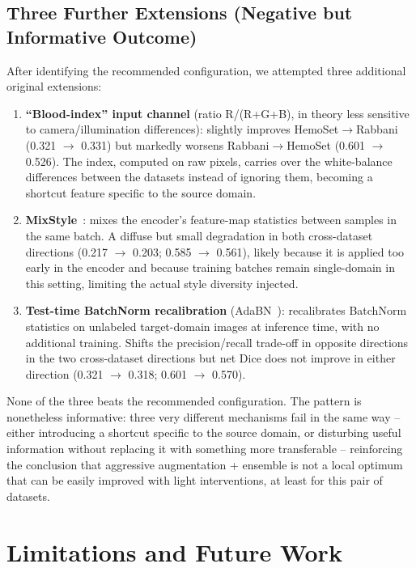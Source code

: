 \documentclass[10pt,conference]{IEEEtran}
\begin{document}
\subsection{Three Further Extensions (Negative but Informative Outcome)}
\label{sec:extensions}

After identifying the recommended configuration, we attempted three additional original extensions:

\begin{enumerate}
\item \textbf{``Blood-index'' input channel} (ratio R/(R+G+B), in theory less sensitive to camera/illumination differences): slightly improves HemoSet$\rightarrow$Rabbani (0.321 $\rightarrow$ 0.331) but markedly worsens Rabbani$\rightarrow$HemoSet (0.601 $\rightarrow$ 0.526). The index, computed on raw pixels, carries over the white-balance differences between the datasets instead of ignoring them, becoming a shortcut feature specific to the source domain.
\item \textbf{MixStyle}~\cite{zhou2021mixstyle}: mixes the encoder's feature-map statistics between samples in the same batch. A diffuse but small degradation in both cross-dataset directions (0.217 $\rightarrow$ 0.203; 0.585 $\rightarrow$ 0.561), likely because it is applied too early in the encoder and because training batches remain single-domain in this setting, limiting the actual style diversity injected.
\item \textbf{Test-time BatchNorm recalibration} (AdaBN~\cite{li2016adabn}): recalibrates BatchNorm statistics on unlabeled target-domain images at inference time, with no additional training. Shifts the precision/recall trade-off in opposite directions in the two cross-dataset directions but net Dice does not improve in either direction (0.321 $\rightarrow$ 0.318; 0.601 $\rightarrow$ 0.570).
\end{enumerate}

None of the three beats the recommended configuration. The pattern is nonetheless informative: three very different mechanisms fail in the same way -- either introducing a shortcut specific to the source domain, or disturbing useful information without replacing it with something more transferable -- reinforcing the conclusion that aggressive augmentation + ensemble is not a local optimum that can be easily improved with light interventions, at least for this pair of datasets.

\section{Limitations and Future Work}
\end{document}
